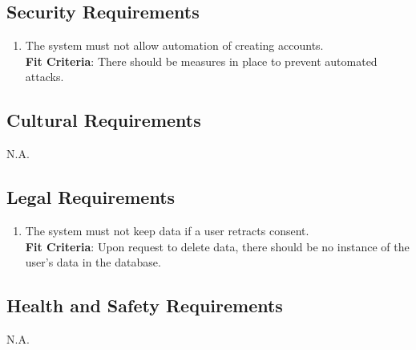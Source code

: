 \documentclass{article}
\begin{document}
\subsection{Security Requirements}
\begin{enumerate}[{SR}1. ]
    \item The system must not allow automation of creating accounts. \\
    \textbf{Fit Criteria}: There should be measures in place to prevent automated attacks. \\
    
\end{enumerate}
\subsection{Cultural Requirements}
N.A.
\subsection{Legal Requirements}
\begin{enumerate}[{LR}1. ]
    \item The system must not keep data if a user retracts consent. \\
    \textbf{Fit Criteria}:  Upon request to delete data, there should be no instance of the user's data in the database.
\end{enumerate}

\subsection{Health and Safety Requirements}
N.A.\\
\end{document}
